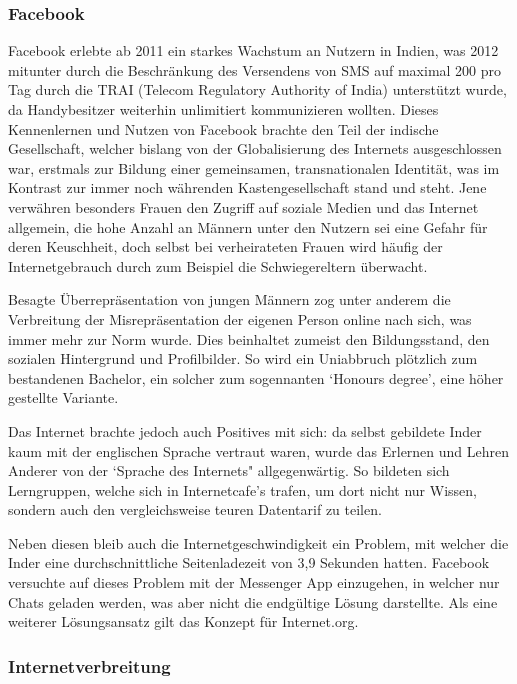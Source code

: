 \documentclass{article}
\begin{document}
\subsubsection{Facebook}

Facebook erlebte ab 2011 ein starkes Wachstum an Nutzern in Indien, was 2012 mitunter durch die Beschränkung des Versendens von SMS auf maximal 200 pro Tag durch die TRAI (Telecom Regulatory Authority of India) unterstützt wurde, da Handybesitzer weiterhin unlimitiert kommunizieren wollten.
Dieses Kennenlernen und Nutzen von Facebook brachte den Teil der indische Gesellschaft, welcher bislang von der Globalisierung des Internets ausgeschlossen war, erstmals zur Bildung einer gemeinsamen, transnationalen Identität, was im Kontrast zur immer noch währenden Kastengesellschaft stand und steht.
Jene verwähren besonders Frauen den Zugriff auf soziale Medien und das Internet allgemein, die hohe Anzahl an Männern unter den Nutzern sei eine Gefahr für deren Keuschheit, doch selbst bei verheirateten Frauen wird häufig der Internetgebrauch durch zum Beispiel die Schwiegereltern überwacht.

\medskip

Besagte Überrepräsentation von jungen Männern zog unter anderem die Verbreitung der Misrepräsentation der eigenen Person online nach sich, was immer mehr zur Norm wurde.
Dies beinhaltet zumeist den Bildungsstand, den sozialen Hintergrund und Profilbilder. So wird ein Uniabbruch plötzlich zum bestandenen Bachelor, ein solcher zum sogennanten `Honours degree', eine höher gestellte Variante.

\medskip

Das Internet brachte jedoch auch Positives mit sich: da selbst gebildete Inder kaum mit der englischen Sprache vertraut waren, wurde das Erlernen und Lehren Anderer von der `Sprache des Internets" allgegenwärtig.
So bildeten sich Lerngruppen, welche sich in Internetcafe's trafen, um dort nicht nur Wissen, sondern auch den vergleichsweise teuren Datentarif zu teilen.

Neben diesen bleib auch die Internetgeschwindigkeit ein Problem, mit welcher die Inder eine durchschnittliche Seitenladezeit von 3,9 Sekunden hatten\autocite{mashable}.
Facebook versuchte auf dieses Problem mit der Messenger App einzugehen, in welcher nur Chats geladen werden, was aber nicht die endgültige Lösung darstellte.
Als eine weiterer Lösungsansatz gilt das Konzept für Internet.org.

\subsubsection{Internetverbreitung}
\end{document}
